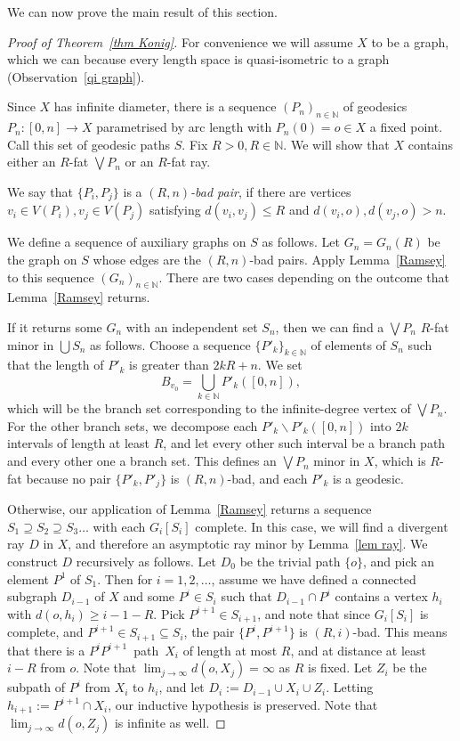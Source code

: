 \documentclass[a4paper]{article}
\newcommand{\defi}[1]{{\color{darkgray}\emph{#1}}}
\newcommand{\N}{\ensuremath{\mathbb N}}
\newcommand{\sm}{\backslash}
\newcommand{\pth}[2]{\ensuremath{#1}\text{--}\ensuremath{#2}~path}
\newcommand{\seq}[1]{\ensuremath{(#1_n)_{n\in\N}}}
\newcommand{\Lr}[1]{Lemma~\ref{#1}}
\newcommand{\Tr}[1]{Theorem~\ref{#1}}
\newcommand{\Or}[1]{Observation~\ref{#1}}
\begin{document}
We can now prove the main result of this section.
\begin{proof}[Proof of \Tr{thm Konig}]
For convenience we will assume $X$ to be a graph, which we can because every length space is quasi-isometric to a graph (\Or{qi graph}). 

Since $X$ has infinite diameter, there is a sequence $\seq{P}$ of geodesics $P_n:[0,n]\to X$ parametrised by arc length with $P_n(0)=o\in X$ a fixed point.
Call this set of geodesic paths $S$.
Fix $R>0, R\in \mathbb N$. We will show that $X$ contains either an $R$-fat $\bigvee P_n$
or an $R$-fat ray.

We say that $\{P_i,P_j\}$ is a \defi{$(R,n)$-bad pair}, if there are  vertices $v_i\in V(P_i), v_j\in V(P_j)$ satisfying $d(v_i,v_j)\leq R$ and $d(v_i,o), d(v_j,o) > n$.

We define a sequence of auxiliary graphs on $S$ as follows. Let $G_n=G_n(R)$ be the graph on $S$ whose edges are the $(R,n)$-bad pairs. Apply \Lr{Ramsey} to this sequence \seq{G}. There are two cases depending on the outcome that \Lr{Ramsey} returns. 

If it returns some $G_n$ with an independent set $S_n$, then we can find a $\bigvee P_n$ $R$-fat minor in $\bigcup S_n$ as follows. Choose a sequence $\{P'_k\}_{k\in \N}$ of elements of $S_n$
such that the length of $P'_k$ is greater than $2kR+n$. We set 
$$B_{v_0}=\bigcup_{k\in \N} P'_k([0,n]),$$ 
which will be the branch set corresponding to the infinite-degree vertex of $\bigvee P_n$. For the other branch sets, we decompose each $P'_k \sm P'_k([0,n])$ into $2k$ intervals of length at least $R$, and let every other such interval be a branch path and every other one a branch set.
This defines an $\bigvee P_n$ minor in $X$, which is $R$-fat because no pair $\{P'_k,P'_j\}$ is $(R,n)$-bad, and each $P'_k$ is a geodesic. 

\medskip
Otherwise, our application of \Lr{Ramsey} returns a sequence $S_1 \supseteq S_2 \supseteq S_3 \ldots$ with each $G_i[S_i]$ complete. In this case, we will find a divergent ray $D$ in $X$, and therefore an asymptotic ray minor by \Lr{lem ray}. We construct $D$ recursively as follows. Let $D_0$ be the trivial path $\{o\}$, and pick an element  $P^1$ of $S_1$. Then for $i=1,2, \ldots$, assume we have defined a connected subgraph $D_{i-1}$ of $X$ and some $P^{i}\in S_i$ such that $D_{i-1} \cap P^{i}$ contains a vertex $h_i$ with $d(o,h_i)\geq i-1-R$. Pick $P^{i+1}\in S_{i+1}$, and note that since $G_{i}[S_{i}]$ is complete, and $P^{i+1}\in S_{i+1} \subseteq S_i$, the pair $\{P^{i}, P^{i+1}\}$ is $(R,i)$-bad. This means that there is a \pth{P^{i}}{P^{i+1}}\ $X_i$ of length at most $R$, and at distance at least $i-R$ from $o$. Note that $\lim_{j\to \infty} d(o, X_j)= \infty$ as $R$ is fixed.  Let $Z_i$ be the subpath of $P^{i}$ from $X_i$ to $h_{i}$, and let $D_{i}:=D_{i-1} \cup X_i \cup Z_i$. Letting $h_{i+1}:= P^{i+1} \cap X_i$,  our inductive hypothesis is preserved. Note that $\lim_{j\to \infty} d(o, Z_j)$ is infinite as well. 


\end{proof}
\end{document}
